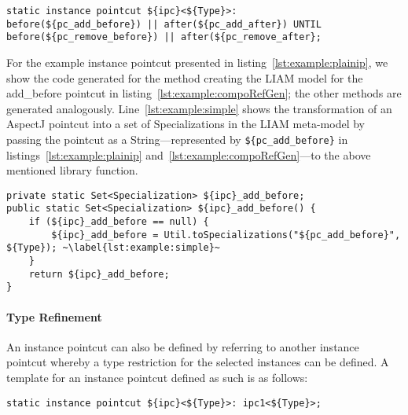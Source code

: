 \begin{lstlisting}[caption={Example of a plain instance pointcut}, label=lst:example:plainip,moreemph=instance]
static instance pointcut ${ipc}<${Type}>:
before(${pc_add_before}) || after(${pc_add_after}) UNTIL
before(${pc_remove_before}) || after(${pc_remove_after};
\end{lstlisting}

For the example instance pointcut presented in listing~\ref{lst:example:plainip}, we show the code generated for the method creating the LIAM model for the add_before pointcut in listing~\ref{lst:example:compoRefGen}; the other methods are generated analogously.
Line~\ref{lst:example:simple} shows the transformation of an AspectJ pointcut into a set of Specializations in the LIAM meta-model by passing the pointcut as a String---represented by \lstinline!${pc_add_before}! in listings~\ref{lst:example:plainip} and~\ref{lst:example:compoRefGen}---to the above mentioned library function.

\begin{lstlisting}[caption={Template for creating the LIAM model for the add_before expression},label={lst:example:compoRefGen}]
private static Set<Specialization> ${ipc}_add_before;
public static Set<Specialization> ${ipc}_add_before() {
	if (${ipc}_add_before == null) {
		${ipc}_add_before = Util.toSpecializations("${pc_add_before}", ${Type}); ~\label{lst:example:simple}~
	}
	return ${ipc}_add_before;
}
\end{lstlisting}

\paragraph{Type Refinement}
An instance pointcut can also be defined by referring to another instance pointcut whereby a type restriction for the selected instances can be defined.
A template for an instance pointcut defined as such is as follows:

\begin{lstlisting}[numbers=none, emph={instance}]
static instance pointcut ${ipc}<${Type}>: ipc1<${Type}>;
\end{lstlisting}

